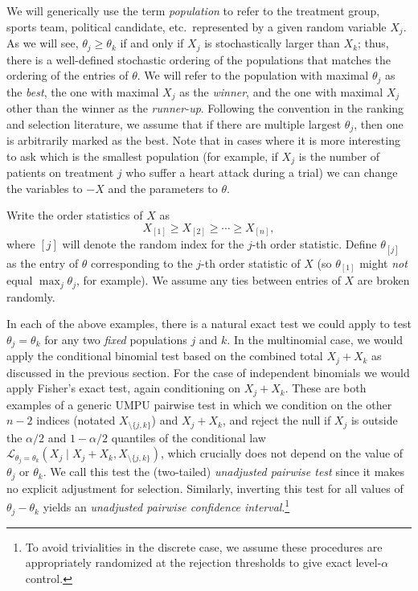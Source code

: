 \documentclass[11pt]{article}
\theoremstyle{definition}
\theoremstyle{custom}
\begin{document}
We will generically use the term {\em population} to refer to the treatment group, sports team, political candidate, etc.\ represented by a given random variable $X_j$. As we will see, $\theta_j \ge \theta_k$ if and only if $X_j$ is stochastically larger than $X_k$; thus, there is a well-defined stochastic ordering of the populations that matches the ordering of the entries of $\theta$. We will refer to the population with maximal $\theta_j$ as the {\em best}, the one with maximal $X_j$ as the {\em winner}, and the one with maximal $X_j$ other than the winner as the {\em runner-up}. Following the convention in the ranking and selection literature, we assume that if there are multiple largest $\theta_j$, then one is arbitrarily marked as the best. Note that in cases where it is more interesting to ask which is the smallest population (for example, if $X_j$ is the number of patients on treatment $j$ who suffer a heart attack during a trial) we can change the variables to $-X$ and the parameters to $\theta$. 

Write the order statistics of $X$ as
$$X_{[1]} \ge X_{[2]} \ge \cdots \ge X_{[n]},$$
where $[j]$ will denote the random index for the $j$-th order statistic. Define $\theta_{[j]}$ as the entry of $\theta$ corresponding to the $j$-th order statistic of $X$ (so $\theta_{[1]}$ might {\em not} equal $\max_j \theta_j$, for example). We assume any ties between entries of $X$ are broken randomly.

In each of the above examples, there is a natural exact test we could apply to test $\theta_j=\theta_k$ for any two {\em fixed} populations $j$ and $k$. In the multinomial case, we would apply the conditional binomial test based on the combined total $X_j+X_k$ as discussed in the previous section. For the case of independent binomials we would apply Fisher's exact test, again conditioning on $X_j+X_k$. These are both examples of a generic UMPU pairwise test in which we condition on the other $n-2$ indices (notated $X_{\setminus \{j,k\}}$) and $X_j+X_k$, and reject the null if $X_j$ is outside the $\alpha/2$ and $1-\alpha/2$ quantiles of the conditional law $\mathcal{L}_{\theta_j=\theta_k}(X_j \mid X_j+X_k, X_{\setminus\{j,k\}})$, which crucially does not depend on the value of $\theta_j$ or $\theta_k$. We call this test the (two-tailed) {\em unadjusted pairwise test} since it makes no explicit adjustment for selection. Similarly, inverting this test for all values of $\theta_j-\theta_k$ yields an {\em unadjusted pairwise confidence interval}.\footnote{To avoid trivialities in the discrete case, we assume these procedures are appropriately randomized at the rejection thresholds to give exact level-$\alpha$ control.}
\end{document}
